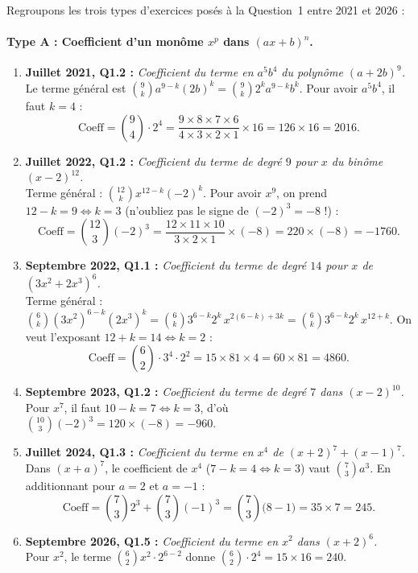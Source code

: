 \begin{exemple}
Regroupons les trois types d'exercices posés à la Question~1 entre 2021 et 2026 :

\paragraph{Type A : Coefficient d'un monôme $x^p$ dans $(ax + b)^n$.}
\begin{enumerate}
    \item \textbf{Juillet 2021, Q1.2 :} \emph{Coefficient du terme en $a^5 b^4$ du polynôme $(a + 2b)^9$.}\\
    Le terme général est $\binom{9}{k} a^{9-k} (2b)^k = \binom{9}{k} 2^k a^{9-k} b^k$. Pour avoir $a^5 b^4$, il faut $k = 4$ :
    \[
        \text{Coeff} = \binom{9}{4} \cdot 2^4 = \frac{9 \times 8 \times 7 \times 6}{4 \times 3 \times 2 \times 1} \times 16 = 126 \times 16 = \boxed{2016}.
    \]
    \item \textbf{Juillet 2022, Q1.2 :} \emph{Coefficient du terme de degré $9$ pour $x$ du binôme $(x - 2)^{12}$.}\\
    Terme général : $\binom{12}{k} x^{12-k} (-2)^k$. Pour avoir $x^9$, on prend $12 - k = 9 \iff k = 3$ (n'oubliez pas le signe de $(-2)^3 = -8$ !) :
    \[
        \text{Coeff} = \binom{12}{3} (-2)^3 = \frac{12 \times 11 \times 10}{3 \times 2 \times 1} \times (-8) = 220 \times (-8) = \boxed{-1760}.
    \]
    \item \textbf{Septembre 2022, Q1.1 :} \emph{Coefficient du terme de degré $14$ pour $x$ de $(3x^2 + 2x^3)^6$.}\\
    Terme général : $\binom{6}{k} (3x^2)^{6-k} (2x^3)^k = \binom{6}{k} 3^{6-k} 2^k \, x^{2(6-k) + 3k} = \binom{6}{k} 3^{6-k} 2^k \, x^{12 + k}$.
    On veut l'exposant $12 + k = 14 \iff k = 2$ :
    \[
        \text{Coeff} = \binom{6}{2} \cdot 3^4 \cdot 2^2 = 15 \times 81 \times 4 = 60 \times 81 = \boxed{4860}.
    \]
    \item \textbf{Septembre 2023, Q1.2 :} \emph{Coefficient du terme de degré $7$ dans $(x - 2)^{10}$.}\\
    Pour $x^7$, il faut $10 - k = 7 \iff k = 3$, d'où $\binom{10}{3} (-2)^3 = 120 \times (-8) = \boxed{-960}$.
    \item \textbf{Juillet 2024, Q1.3 :} \emph{Coefficient du terme en $x^4$ de $(x + 2)^7 + (x - 1)^7$.}\\
    Dans $(x + a)^7$, le coefficient de $x^4$ ($7 - k = 4 \iff k = 3$) vaut $\binom{7}{3} a^3$. En additionnant pour $a = 2$ et $a = -1$ :
    \[
        \text{Coeff} = \binom{7}{3} 2^3 + \binom{7}{3} (-1)^3 = \binom{7}{3}\bigl(8 - 1\bigr) = 35 \times 7 = \boxed{245}.
    \]
    \item \textbf{Septembre 2026, Q1.5 :} \emph{Coefficient du terme en $x^2$ dans $(x + 2)^6$.}\\
    Pour $x^2$, le terme $\binom{6}{2} x^2 \cdot 2^{6-2}$ donne $\binom{6}{2} \cdot 2^4 = 15 \times 16 = \boxed{240}$.
\end{enumerate}


\end{exemple}
